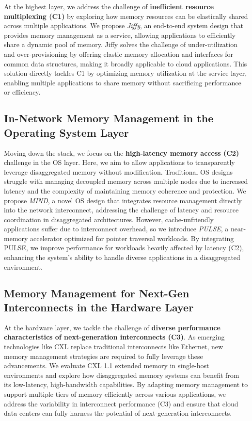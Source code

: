 At the highest layer, we address the challenge of \textbf{inefficient resource multiplexing (C1)} by exploring how memory resources can be elastically shared across multiple applications. We propose \textit{Jiffy}, an end-to-end system design that provides memory management as a service, allowing applications to efficiently share a dynamic pool of memory. Jiffy solves the challenge of under-utilization and over-provisioning by offering elastic memory allocation and interfaces for common data structures, making it broadly applicable to cloud applications. This solution directly tackles C1 by optimizing memory utilization at the service layer, enabling multiple applications to share memory without sacrificing performance or efficiency.

\subsection{In-Network Memory Management in the Operating System Layer}

Moving down the stack, we focus on the \textbf{high-latency memory access (C2)} challenge in the OS layer. Here, we aim to allow applications to transparently leverage disaggregated memory without modification. Traditional OS designs struggle with managing decoupled memory across multiple nodes due to increased latency and the complexity of maintaining memory coherence and protection. We propose \textit{MIND}, a novel OS design that integrates resource management directly into the network interconnect, addressing the challenge of latency and resource coordination in disaggregated architectures. However, cache-unfriendly applications suffer due to interconnect overhead, so we introduce \textit{PULSE}, a near-memory accelerator optimized for pointer traversal workloads. By integrating PULSE, we improve performance for workloads heavily affected by latency (C2), enhancing the system’s ability to handle diverse applications in a disaggregated environment.

\subsection{Memory Management for Next-Gen Interconnects in the Hardware Layer}

At the hardware layer, we tackle the challenge of \textbf{diverse performance characteristics of next-generation interconnects (C3)}. As emerging technologies like CXL replace traditional interconnects like Ethernet, new memory management strategies are required to fully leverage these advancements. We evaluate CXL 1.1 extended memory in single-host environments and explore how disaggregated memory systems can benefit from its low-latency, high-bandwidth capabilities. By adapting memory management to support multiple tiers of memory efficiently across various applications, we address the variability in interconnect performance (C3) and ensure that cloud data centers can fully harness the potential of next-generation interconnects.

